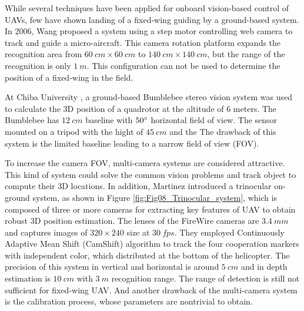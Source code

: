 \documentclass[journal,article,submit,moreauthors,pdftex,10pt,a4paper]{mdpi}
\begin{document}
%
While several techniques have been applied for onboard vision-based control of UAVs, few have shown landing of a fixed-wing guiding by a ground-based system. In 2006, Wang \cite{Wang2006} proposed a system using a step motor controlling web camera to track and guide a micro-aircraft. This camera rotation platform expands the recognition area from $60\ cm\times60\ cm$ to $140\ cm\times140\ cm$, but the range of the recognition is only $1\ m$. This configuration can not be used to determine the position of a fixed-wing in the field.

At Chiba University \cite{pebrianti2010autonomous}, a ground-based Bumblebee stereo vision system was used to calculate the 3D position of a quadrotor at the altitude of 6 meters. The Bumblebee has $12\ cm$ baseline with $50\degree$ horizontal field of view. The sensor mounted on a tripod with the hight of $45\ cm$ and the 
The drawback of this system is the limited baseline leading to a narrow field of view (FOV). 

To increase the camera FOV, multi-camera systems are considered attractive. This kind of system could solve the common vision problems and track object to compute their 3D locations. In addition, Martinez \cite{Martinez2009a} introduced a trinocular on-ground system, as shown in Figure  \ref{fig:Fig08_Trinocular_system}, which is composed of three or more cameras for extracting key features of UAV to obtain robust 3D position estimation. The lenses of the FireWire cameras are $3.4\ mm$ and captures images of $320\times240$ size at $30\ fps$. They employed Continuously Adaptive Mean Shift (CamShift) algorithm to track the four cooperation markers with independent color, which distributed at the bottom of the helicopter. The precision of this system in vertical and horizontal is around $5\ cm$ and in depth estimation is $10\ cm$ with $3\ m$ recognition range. The range of detection is still not sufficient for fixed-wing UAV. And another drawback of the multi-camera system is the calibration process, whose parameters are nontrivial to obtain. 
\end{document}
